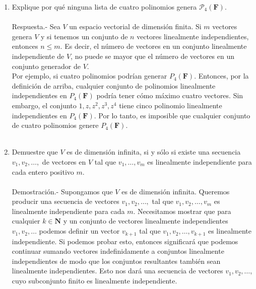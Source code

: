 \begin{enumerate}[\bfseries 1.]
    \item Explique por qué ninguna lista de cuatro polinomios genera $\mathcal{P}_4 (\textbf{F})$.\\\\
	Respuesta.-\; Sea $V$ un espacio vectorial de dimensión finita. Si $m$ vectores genera $V$ y si tenemos un conjunto de $n$ vectores linealmente independientes, entonces $n\leq m$. Es decir, el número de vectores en un conjunto linealmente independiente de $V$, no puede se mayor que el número de vectores en un conjunto generador de $V$.\\
	Por ejemplo, si cuatro polinomios podrían generar $P_4(\textbf{F})$. Entonces, por la definición de arriba, cualquier conjunto de polinomios linealmente independientes en $P_4(\textbf{F})$ podría tener cómo máximo cuatro vectores. Sin embargo, el conjunto $1,z,z^2,z^3,z^4$ tiene cinco polinomio linealmente independientes en $P_4(\textbf{F})$. Por lo tanto, es imposible que cualquier conjunto de cuatro polinomios genere $P_4(\textbf{F})$.\\\\

    \item Demuestre que $V$ es de dimensión infinita, si y sólo si existe una secuencia $v_1,v_2,\ldots,$ de vectores en $V$ tal que $v_1,\ldots,v_m$ es linealmente independiente para cada entero positivo $m$.\\\\
	Demostración.-\; Supongamos que $V$ es de dimensión infinita. Queremos producir una secuencia de vectores $v_1,v_2,\ldots,$ tal que $v_1,v_2,\ldots,v_m$ es linealmente independiente para cada $m$. Necesitamos mostrar que para cualquier $k\in \textbf{N}$ y un conjunto de vectores linealmente independientes $v_1,v_2,\ldots$ podemos definir un vector $v_{k+1}$ tal que $v_1,v_2,\ldots,v_{k+1}$ es linealmente independiente. Si podemos probar esto, entonces significará que podemos continuar sumando vectores indefinidamente a conjuntos linealmente independientes de modo que los conjuntos resultantes también sean linealmente independientes. Esto nos dará una secuencia de vectores $v_1,v_2,\ldots$, cuyo subconjunto finito es linealmente independiente.\\


\end{enumerate}
